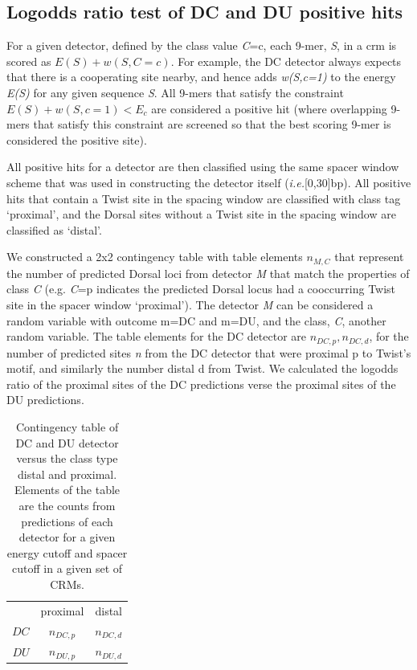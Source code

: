 \subsection{Logodds ratio test of DC and DU positive hits} 
 For a given detector, defined by the class value \textit{C}=c, each 9-mer, \textit{S}, in a crm is scored as $E(S)+w(S,C=c)$.  For example, the DC detector always expects that there is a cooperating site nearby, and hence adds \textit{w(S,c=1)} to the energy \textit{E(S)} for any given sequence \textit{S}.  All 9-mers that satisfy the constraint $E(S) + w(S,c=1) < E_c$ are considered a positive hit (where overlapping 9-mers that satisfy this constraint are screened so that the best scoring 9-mer is considered the positive site).

All positive hits for a detector are then classified using the same spacer window scheme that was used in constructing the detector itself (\textit{i.e.}[0,30]bp).  All positive hits that contain a Twist site in the spacing window are classified with class tag `proximal', and the Dorsal sites without a Twist site in the spacing window are classified as `distal'.

We constructed a 2x2 contingency table with table elements $n_{M,C}$ that represent the number of predicted Dorsal loci from detector \textit{M} that match the properties of class \textit{C} (e.g. \textit{C}=p indicates the predicted Dorsal locus had a cooccurring Twist site in the spacer window `proximal'). The detector \textit{M} can be considered a random variable with outcome m=DC and m=DU, and the class, \textit{C}, another random variable.  The table elements for the DC detector are $n_{DC,p},n_{DC,d}$, for the number of predicted sites \textit{n} from the DC detector that were proximal p to Twist's motif, and similarly the number distal d from Twist.  We calculated the logodds ratio of the proximal sites of the DC predictions verse the proximal sites of the DU predictions.

\begin{table}[h]
\centering
  \begin{tabular}{ r|c|c| }
\multicolumn{1}{r}{}
 &  \multicolumn{1}{c}{proximal}
 & \multicolumn{1}{c}{distal} \\
\cline{2-3}
$DC$ & $n_{DC,p}$ &  $n_{DC,d}$ \\
\cline{2-3}
$DU$ &  $n_{DU,p}$ & $n_{DU,d}$ \\
\cline{2-3}
\end{tabular}
\caption{Contingency table of DC and DU detector versus the class type distal and proximal.  Elements of the table are the counts from predictions of each detector for a given energy cutoff and spacer cutoff in a given set of CRMs.}\label{tabless3s}
\end{table}


